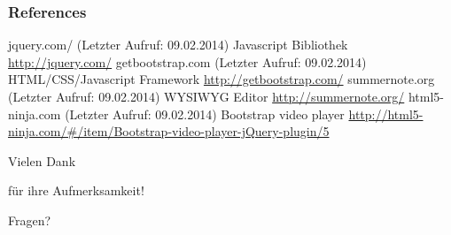 \documentclass{beamer}
\begin{document}
\begin{frame}[fragile]
\frametitle{References}
\tiny{
\begin{thebibliography}{99}
 jquery.com/ (Letzter Aufruf: 09.02.2014)
	\newblock Javascript Bibliothek
	\newblock \url{http://jquery.com/}
 getbootstrap.com (Letzter Aufruf: 09.02.2014)
	\newblock HTML/CSS/Javascript Framework
	\newblock \url{http://getbootstrap.com/}
 summernote.org (Letzter Aufruf: 09.02.2014)
	\newblock WYSIWYG Editor
	\newblock \url{http://summernote.org/}
 html5-ninja.com (Letzter Aufruf: 09.02.2014)
	\newblock Bootstrap video player
	\newblock
	\url{http://html5-ninja.com/#/item/Bootstrap-video-player-jQuery-plugin/5}

\end{thebibliography}
}
\end{frame}
\begin{frame}
\Large{\centerline{Vielen Dank}}
\Large{\centerline{für ihre Aufmerksamkeit!}}
\Large{\centerline{}}
\Large{\centerline{Fragen?}}
\end{frame}
\end{document}
